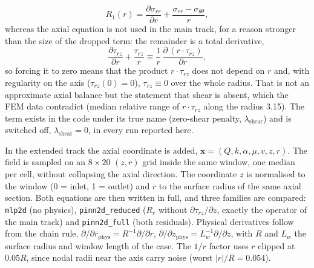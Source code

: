\begin{equation}
  R_1(r) = \frac{\partial\sigma_{rr}}{\partial r}
         + \frac{\sigma_{rr}-\sigma_{\theta\theta}}{r},
  \label{eq:eq_red}
\end{equation}
whereas the axial equation is not used in the main track, for a reason stronger
than the size of the dropped term: the remainder is a total derivative,
\begin{equation}
  \frac{\partial\tau_{rz}}{\partial r} + \frac{\tau_{rz}}{r}
  \equiv \frac{1}{r}\,\frac{\partial\,(r\cdot\tau_{rz})}{\partial r},
  \label{eq:identity}
\end{equation}
so forcing it to zero means that the product $r\cdot\tau_{rz}$ does not depend on $r$ and, with regularity on
the axis ($\tau_{rz}(0)=0$), $\tau_{rz}\equiv0$ over the whole radius. That is not
an approximate axial balance but the statement that shear is absent, which the
FEM data contradict (median relative range of $r\cdot\tau_{rz}$ along the radius
3.15).
The term exists in the code under its true name (zero-shear penalty,
$\lambda_{\mathrm{shear}}$) and is switched off, $\lambda_{\mathrm{shear}}=0$, in
every run reported here.

In the extended track the axial coordinate is added,
$\mathbf{x}=(Q,k,\alpha,\mu,v,z,r)$. The field is sampled on an $8\times20$ $(z,r)$
grid inside the same window, one median per cell, without collapsing the axial
direction. The coordinate $z$ is normalised to the window (0 = inlet, 1 = outlet) and $r$ to the
surface radius of the same axial section.
Both equations are then written in full, and three families are compared:
\texttt{mlp2d} (no physics), \texttt{pinn2d\_reduced} ($R_r$ without
$\partial\tau_{rz}/\partial z$, exactly the operator of the main track) and
\texttt{pinn2d\_full} (both residuals).
Physical derivatives follow from the chain rule,
$\partial/\partial r_{\mathrm{phys}}=R^{-1}\partial/\partial r$,
$\partial/\partial z_{\mathrm{phys}}=L_w^{-1}\partial/\partial z$, with $R$ and $L_w$
the surface radius and window length of the case. The $1/r$ factor uses $r$
clipped at $0.05R$, since nodal radii near the axis carry noise (worst
$|r|/R=0.054$).

